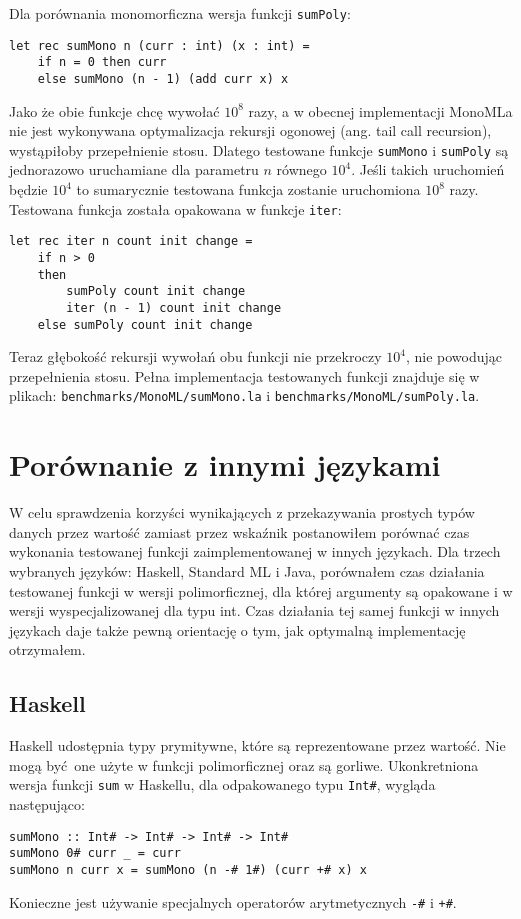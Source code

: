 \documentclass[declaration,shortabstract]{iithesis}
\begin{document}
Dla porównania monomorficzna wersja funkcji \texttt{sumPoly}: 
\begin{lstlisting}[frame=lines]
let rec sumMono n (curr : int) (x : int) = 
    if n = 0 then curr 
    else sumMono (n - 1) (add curr x) x 
\end{lstlisting}

Jako że obie funkcje chcę wywołać $10^8$ razy, a w obecnej implementacji
MonoMLa nie jest wykonywana optymalizacja rekursji ogonowej (ang. tail call 
recursion), wystąpiłoby przepełnienie stosu. Dlatego testowane funkcje 
\texttt{sumMono} i \texttt{sumPoly} są jednorazowo uruchamiane dla parametru 
$n$ równego $10^4$. Jeśli takich uruchomień będzie $10^4$ to sumarycznie
testowana funkcja zostanie uruchomiona $10^8$ razy. Testowana funkcja została 
opakowana w funkcje \texttt{iter}:
\begin{lstlisting}[frame=lines]
let rec iter n count init change = 
    if n > 0
    then 
        sumPoly count init change
        iter (n - 1) count init change
    else sumPoly count init change
\end{lstlisting}
Teraz głębokość rekursji wywołań obu funkcji nie przekroczy $10^4$, nie powodując 
przepełnienia stosu. Pełna implementacja testowanych funkcji znajduje się w plikach:
\texttt{benchmarks/MonoML/sumMono.la} i \texttt{benchmarks/MonoML/sumPoly.la}.

\section{Porównanie z innymi językami}

W celu sprawdzenia korzyści wynikających z przekazywania prostych typów danych 
przez wartość zamiast przez wskaźnik postanowiłem porównać czas wykonania 
testowanej funkcji zaimplementowanej w innych językach. Dla trzech wybranych 
języków: Haskell, Standard ML i Java, porównałem czas działania testowanej funkcji 
w wersji polimorficznej, dla której argumenty są opakowane i w wersji wyspecjalizowanej 
dla typu int. Czas działania tej samej funkcji w innych językach daje także pewną 
orientację o tym, jak optymalną implementację otrzymałem.

\subsection{Haskell}

Haskell udostępnia typy prymitywne, które są reprezentowane przez wartość. Nie 
mogą być one użyte w funkcji polimorficznej oraz są gorliwe. Ukonkretniona 
wersja funkcji \texttt{sum} w Haskellu, dla odpakowanego typu \texttt{Int\#}, 
wygląda następująco:
\begin{lstlisting}[frame=lines]
sumMono :: Int# -> Int# -> Int# -> Int# 
sumMono 0# curr _ = curr 
sumMono n curr x = sumMono (n -# 1#) (curr +# x) x
\end{lstlisting}
Konieczne jest używanie specjalnych operatorów arytmetycznych \texttt{-\#}
i \texttt{+\#}. 
\end{document}
